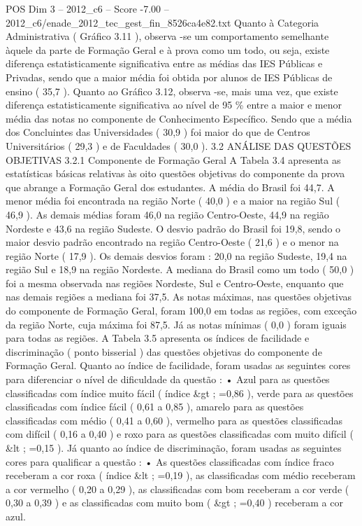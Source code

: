 \begin{textsample}{POS Dim 3 – 2012\_c6 – Score -7.00 – 2012\_c6/enade\_2012\_tec\_gest\_fin\_8526ca4e82.txt}
Quanto à Categoria Administrativa ( Gráfico 3.11 ), observa -se um comportamento semelhante àquele da parte de Formação Geral e à prova como um todo, ou seja, existe diferença estatisticamente significativa entre as médias das IES Públicas e Privadas, sendo que a maior média foi obtida por alunos de IES Públicas de ensino ( 35,7 ).
Quanto ao Gráfico 3.12, observa -se, mais uma vez, que existe diferença estatisticamente significativa ao nível de 95 \% entre a maior e menor média das notas no componente de Conhecimento Específico.
Sendo que a média dos Concluintes das Universidades ( 30,9 ) foi maior do que de Centros Universitários ( 29,3 ) e de Faculdades ( 30,0 ). 3.2 ANÁLISE DAS QUESTÕES OBJETIVAS 3.2.1 Componente de Formação Geral A Tabela 3.4 apresenta as estatísticas básicas relativas às oito questões objetivas do componente da prova que abrange a Formação Geral dos estudantes.
A média do Brasil foi 44,7.
A menor média foi encontrada na região Norte ( 40,0 ) e a maior na região Sul ( 46,9 ).
As demais médias foram 46,0 na região Centro-Oeste, 44,9 na região Nordeste e 43,6 na região Sudeste.
O desvio padrão do Brasil foi 19,8, sendo o maior desvio padrão encontrado na região Centro-Oeste ( 21,6 ) e o menor na região Norte ( 17,9 ).
Os demais desvios foram : 20,0 na região Sudeste, 19,4 na região Sul e 18,9 na região Nordeste.
A mediana do Brasil como um todo ( 50,0 ) foi a mesma observada nas regiões Nordeste, Sul e Centro-Oeste, enquanto que nas demais regiões a mediana foi 37,5.
As notas máximas, nas questões objetivas do componente de Formação Geral, foram 100,0 em todas as regiões, com exceção da região Norte, cuja máxima foi 87,5.
Já as notas mínimas ( 0,0 ) foram iguais para todas as regiões.
A Tabela 3.5 apresenta os índices de facilidade e discriminação ( ponto bisserial ) das questões objetivas do componente de Formação Geral.
Quanto ao índice de facilidade, foram usadas as seguintes cores para diferenciar o nível de dificuldade da questão : • Azul para as questões classificadas com índice muito fácil ( índice \&gt ; =0,86 ), verde para as questões classificadas com índice fácil ( 0,61 a 0,85 ), amarelo para as questões classificadas com médio ( 0,41 a 0,60 ), vermelho para as questões classificadas com difícil ( 0,16 a 0,40 ) e roxo para as questões classificadas com muito difícil ( \&lt ; =0,15 ).
Já quanto ao índice de discriminação, foram usadas as seguintes cores para qualificar a questão : • As questões classificadas com índice fraco receberam a cor roxa ( índice \&lt ; =0,19 ), as classificadas com médio receberam a cor vermelho ( 0,20 a 0,29 ), as classificadas com bom receberam a cor verde ( 0,30 a 0,39 ) e as classificadas com muito bom ( \&gt ; =0,40 ) receberam a cor azul.

\end{textsample}
